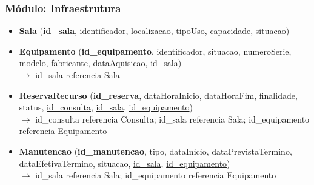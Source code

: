 \subsubsection{Módulo: Infraestrutura}
\begin{itemize}[itemsep=10pt]

    \item \textbf{Sala} (\textbf{id\_sala}, identificador, localizacao, tipoUso, capacidade, situacao)


    \item \textbf{Equipamento} (\textbf{id\_equipamento}, identificador, situacao, numeroSerie, modelo, fabricante, dataAquisicao, \underline{id\_sala})
    \\{\small $\rightarrow$ id\_sala referencia Sala}


    \item \textbf{ReservaRecurso} (\textbf{id\_reserva}, dataHoraInicio, dataHoraFim, finalidade, status, \underline{id\_consulta}, \underline{id\_sala}, \underline{id\_equipamento})
    \\{\small $\rightarrow$ id\_consulta referencia Consulta; id\_sala referencia Sala; id\_equipamento referencia Equipamento}

    \item \textbf{Manutencao} (\textbf{id\_manutencao}, tipo, dataInicio, dataPrevistaTermino, dataEfetivaTermino, situacao, \underline{id\_sala}, \underline{id\_equipamento})
    \\{\small $\rightarrow$ id\_sala referencia Sala; id\_equipamento referencia Equipamento}


\end{itemize}